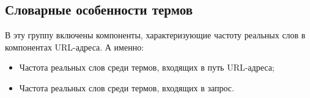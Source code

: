 \subsection*{Словарные особенности термов}

В эту группу включены компоненты, характеризующие частоту реальных слов в компонентах URL-адреса. А именно:

\begin{itemize}
\item Частота реальных слов среди термов, входящих в путь URL-адреса;
\item Частота реальных слов среди термов, входящих в запрос.
\end{itemize}
